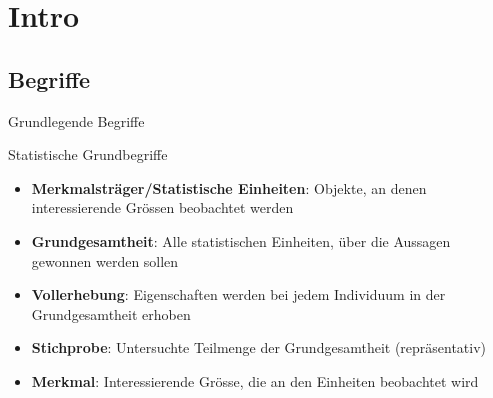 \section{Intro}
\subsection{Begriffe}
\begin{concept}{Grundlegende Begriffe}\\
\end{concept}

\begin{definition}{Statistische Grundbegriffe}
\begin{itemize}
    \item \textbf{Merkmalsträger/Statistische Einheiten}: Objekte, an denen interessierende Grössen beobachtet werden
    \item \textbf{Grundgesamtheit}: Alle statistischen Einheiten, über die Aussagen gewonnen werden sollen
    \item \textbf{Vollerhebung}: Eigenschaften werden bei jedem Individuum in der Grundgesamtheit erhoben
    \item \textbf{Stichprobe}: Untersuchte Teilmenge der Grundgesamtheit (repräsentativ)
    \item \textbf{Merkmal}: Interessierende Grösse, die an den Einheiten beobachtet wird
\end{itemize}
\end{definition}

